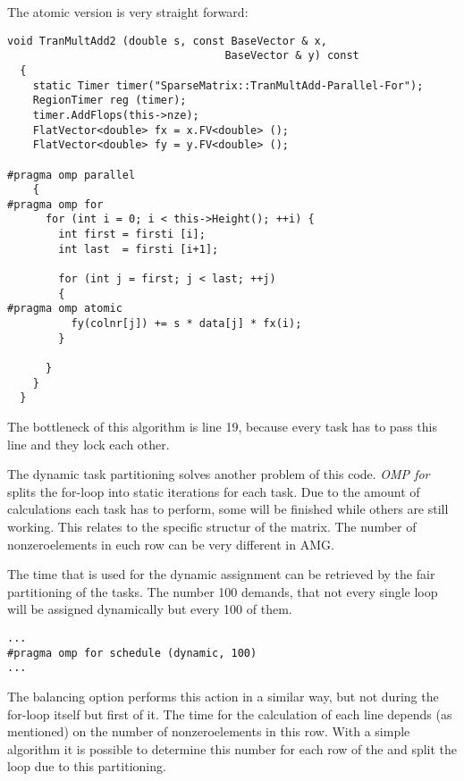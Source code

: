 \documentclass[a4paper,11pt]{scrartcl}
\begin{document}
The atomic version is very straight forward:

\begin{lstlisting}
void TranMultAdd2 (double s, const BaseVector & x,
                                  BaseVector & y) const
  {
    static Timer timer("SparseMatrix::TranMultAdd-Parallel-For");
    RegionTimer reg (timer);
    timer.AddFlops(this->nze);
    FlatVector<double> fx = x.FV<double> ();
    FlatVector<double> fy = y.FV<double> ();

#pragma omp parallel
    {
#pragma omp for
      for (int i = 0; i < this->Height(); ++i) {
        int first = firsti [i];
        int last  = firsti [i+1];

        for (int j = first; j < last; ++j)
        {
#pragma omp atomic
          fy(colnr[j]) += s * data[j] * fx(i);
        }

      }
    }
  }

\end{lstlisting}

The bottleneck of this algorithm is line 19, because every task has to pass this
line and they lock each other.

The dynamic task partitioning solves another problem of this code. {\em OMP for}
 splits the for-loop into static iterations for each task. Due to the amount
 of calculations each task has to perform, some will be finished while others
are still working. This relates to the specific structur of the matrix. The
 number of nonzeroelements in euch row can be very different in AMG.

The time that is used for the dynamic assignment can be retrieved by the fair
partitioning of the tasks. The number 100 demands, that not every single loop
 will be assigned dynamically but every 100 of them.

\begin{lstlisting}
...
#pragma omp for schedule (dynamic, 100)
...
\end{lstlisting}

The balancing option performs this action in a similar way, but not during the
for-loop itself but first of it. The time for the calculation of each line
depends (as mentioned) on the number of nonzeroelements in this row. With a
simple algorithm it is possible to  determine this number for each row of the
 and split the loop due to this partitioning.
\end{document}
